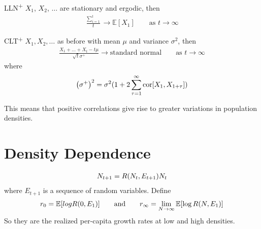 \documentclass{article}
\newcommand{\cor}{\text{cor}}
\newcommand{\expec}{\mathbb{E}}
\begin{document}
            LLN\textsuperscript{$+$} $X_1$, $X_2$, $\dots$ are stationary and ergodic,
            then
            \begin{align*}
                \frac{\sum_{i=1}^t}{t} \rightarrow \expec[X_1] \qquad \text{as $t\rightarrow \infty$}
            \end{align*}

            CLT\textsuperscript{$+$} $X_1,X_2,\dots$ as before with mean $\mu$ and variance $\sigma^2$, then
            \begin{align*}
                \frac{X_1 + \dots + X_t - t\mu}{\sqrt{t}\sigma^+} \rightarrow \text{standard normal} \qquad \text{as $t \rightarrow \infty$}
            \end{align*}
            where
            \begin{align*}
                \qty(\sigma^+)^2 = \sigma^2(1 + 2\sum_{\tau=1}^\infty \cor\qty[X_1,X_{1+\tau}])
            \end{align*}

            This means that positive correlations give rise to greater variations in population densities.

    \section{Density Dependence}
        \begin{align*}
            N_{t+1} = R\qty(N_t, E_{t+1})N_t
        \end{align*}
        where $E_{t+1}$ is a sequence of random variables.  Define
        \begin{align*}
            r_0 = \expec\qty[log R(0, E_1)] \qquad \text{and} \qquad r_\infty = \lim_{N\rightarrow\infty}\expec\qty[\log R(N,E_1)]
        \end{align*}
        So they are the realized per-capita growth rates at low and high densities.
\end{document}
